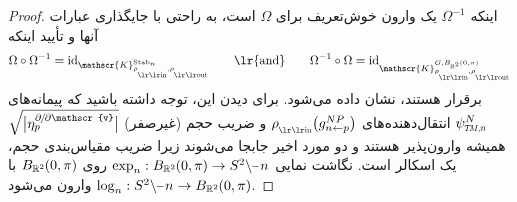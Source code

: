 \begin{proof}
    اینکه $\Omega^{-1}$ یک وارون خوش‌تعریف برای $\Omega$ است، به راحتی با جایگذاری عبارات آنها و تأیید اینکه
    \begin{align}
        \Omega \circ \Omega^{-1} = \id_{\mathscr{K}^{\Stab{n}}_{\rhoin\mkern-1mu,\rhoout}}
        \qquad \textup{\lr{and}} \qquad
        \Omega^{-1} \circ \Omega = \id_{\mathscr{K}^{G,B_{\R^2}\mkern-1mu(0,\pi)}_{\rhoin\mkern-1mu,\rhoout}}
    \end{align}
    برقرار هستند، نشان داده می‌شود.
    برای دیدن این، توجه داشته باشید که پیمانه‌های $\psiTMn^N$ انتقال‌دهنده‌های $\rhoin\big( g_{n\leftarrow p}^{NP} \big)$ و ضریب حجم (غیرصفر) $\sqrt{\big|\eta_p^{\partial\mkern-2mu/\mkern-2mu\partial\mathscr{v}}\big|}$ همیشه وارون‌پذیر هستند و دو مورد اخیر جابجا می‌شوند زیرا ضریب مقیاس‌بندی حجم، یک اسکالر است.
    نگاشت نمایی $\exp_n: B_{\R^2}\mkern-1mu(0,\pi) \to S^2 \backslash \mkern-1mu\minus\mkern1mu n$ روی $B_{\mathbb{R}^2}\mkern-1mu(0,\pi)$ با $\log_n: S^2 \backslash \mkern-1mu\minus\mkern1mu n \to B_{\R^2}\mkern-1mu(0,\pi)$ وارون می‌شود.



\end{proof}
